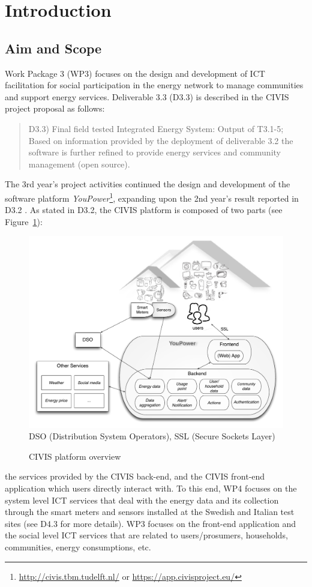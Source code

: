 
\section{Introduction}

\subsection{Aim and Scope} 

Work Package 3 (WP3) focuses on the design and development of ICT facilitation for social participation in the energy network to manage communities and support energy services. Deliverable 3.3 (D3.3) is described in the CIVIS project proposal as follows: 

\begin{quote}
D3.3) Final field tested Integrated Energy System: Output of T3.1-5; Based on information provided by the deployment of deliverable 3.2 the software is further refined to provide energy services and community management (open source). 
\end{quote}

The 3rd year's project activities continued the design and development of the software platform \textit{YouPower}\footnote{\url{http://civis.tbm.tudelft.nl/} or \url{https://app.civisproject.eu/}}, expanding upon the 2nd year's result reported in D3.2 \citep{Huang2015c}. 
As stated in D3.2, the CIVIS platform is composed of two parts (see Figure~\ref{fig:platform}): 
\begin{figure}[h!]
\begin{center}\footnotesize
	\includegraphics[width=.85\textwidth]{img/civis_platform_overview.pdf}\\
	DSO (Distribution System Operators),  SSL (Secure Sockets Layer)
	\caption{CIVIS platform overview}\label{fig:platform}
\end{center}
\end{figure}
% 
the services provided by the CIVIS back-end, and the CIVIS front-end application which users directly interact with. 
%
To this end, WP4 focuses on the system level ICT services that deal with the energy data and its collection through the smart meters and sensors installed at the Swedish and Italian test sites (see D4.3 for more details). 
% 
WP3 focuses on the front-end application and the social level ICT services that are related to users/prosumers, households, communities, energy consumptions, etc. 

